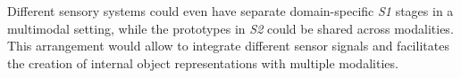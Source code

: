 Different sensory systems could even have separate domain-specific \emph{S1} stages in a multimodal setting, while the prototypes in \emph{S2} could be shared across modalities. This arrangement would allow to integrate different sensor signals and facilitates the creation of internal object representations with multiple modalities.
